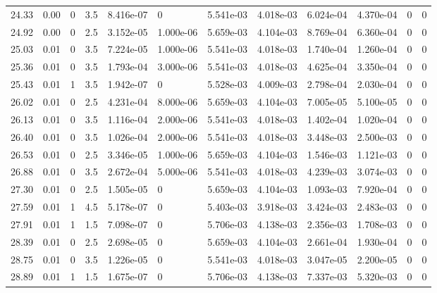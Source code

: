 \documentclass[preview]{standalone}
\begin{document}
{{{\begin{tabular}{L{1.2cm}C{1.2cm} C{0.3cm}C{0.5cm} C{1.4cm}C{1.4cm} C{1.4cm}C{1.4cm} C{1.6cm}C{1.6cm} C{1.6cm}C{1.6cm}}
  24.33  &  0.00  & 0     & 3.5 &  8.416e-07  & 0  &  5.541e-03&   4.018e-03& 6.024e-04 & 4.370e-04   &  0 & 0  \\ 
  24.92  &  0.00  & 0     & 2.5 &  3.152e-05  & 1.000e-06  &  5.659e-03&   4.104e-03& 8.769e-04 & 6.360e-04   &  0 & 0  \\ 
  25.03  &  0.01  & 0     & 3.5 &  7.224e-05  & 1.000e-06  &  5.541e-03&   4.018e-03& 1.740e-04 & 1.260e-04   &  0 & 0  \\ 
  25.36  &  0.01  & 0     & 3.5 &  1.793e-04  & 3.000e-06  &  5.541e-03&   4.018e-03& 4.625e-04 & 3.350e-04   &  0 & 0  \\ 
  25.43  &  0.01  & 1     & 3.5 &  1.942e-07  & 0  &  5.528e-03&   4.009e-03& 2.798e-04 & 2.030e-04   &  0 & 0  \\ 
  26.02  &  0.01  & 0     & 2.5 &  4.231e-04  & 8.000e-06  &  5.659e-03&   4.104e-03& 7.005e-05 & 5.100e-05   &  0 & 0  \\ 
  26.13  &  0.01  & 0     & 3.5 &  1.116e-04  & 2.000e-06  &  5.541e-03&   4.018e-03& 1.402e-04 & 1.020e-04   &  0 & 0  \\ 
  26.40  &  0.01  & 0     & 3.5 &  1.026e-04  & 2.000e-06  &  5.541e-03&   4.018e-03& 3.448e-03 & 2.500e-03   &  0 & 0  \\ 
  26.53  &  0.01  & 0     & 2.5 &  3.346e-05  & 1.000e-06  &  5.659e-03&   4.104e-03& 1.546e-03 & 1.121e-03   &  0 & 0  \\ 
  26.88  &  0.01  & 0     & 3.5 &  2.672e-04  & 5.000e-06  &  5.541e-03&   4.018e-03& 4.239e-03 & 3.074e-03   &  0 & 0  \\ 
  27.30  &  0.01  & 0     & 2.5 &  1.505e-05  & 0  &  5.659e-03&   4.104e-03& 1.093e-03 & 7.920e-04   &  0 & 0  \\ 
  27.59  &  0.01  & 1     & 4.5 &  5.178e-07  & 0  &  5.403e-03&   3.918e-03& 3.424e-03 & 2.483e-03   &  0 & 0  \\ 
  27.91  &  0.01  & 1     & 1.5 &  7.098e-07  & 0  &  5.706e-03&   4.138e-03& 2.356e-03 & 1.708e-03   &  0 & 0  \\ 
  28.39  &  0.01  & 0     & 2.5 &  2.698e-05  & 0  &  5.659e-03&   4.104e-03& 2.661e-04 & 1.930e-04   &  0 & 0  \\ 
  28.75  &  0.01  & 0     & 3.5 &  1.226e-05  & 0  &  5.541e-03&   4.018e-03& 3.047e-05 & 2.200e-05   &  0 & 0  \\ 
  28.89  &  0.01  & 1     & 1.5 &  1.675e-07  & 0  &  5.706e-03&   4.138e-03& 7.337e-03 & 5.320e-03   &  0 & 0  \\ 
\hline 
\end{tabular} 

}}}
\end{document}

